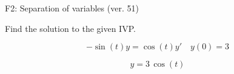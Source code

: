 \begin{exercise}
  \begin{exerciseTitle}F2: Separation of variables (ver. 51)\end{exerciseTitle}
  \begin{exerciseStatement}
    
Find the solution to the given IVP.

    
\[-\sin\left(t\right) y= \cos\left(t\right) y'\hspace{1em} y\left( 0 \right)= 3\]

  \end{exerciseStatement}
  \begin{exerciseAnswer}
    
\[y= 3 \, \cos\left(t\right)\]

  \end{exerciseAnswer}
\end{exercise}